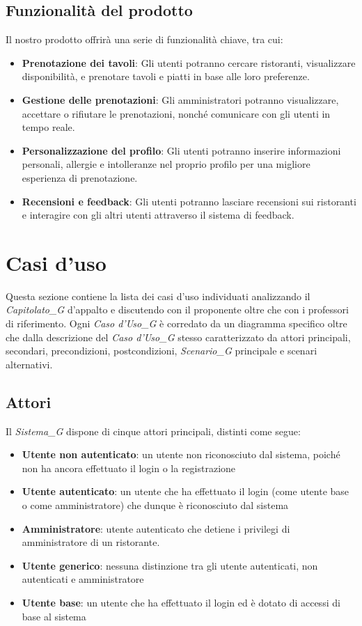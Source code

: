 \documentclass[12pt, oneside]{article}
\begin{document}
\subsection{Funzionalità del prodotto}
Il nostro prodotto offrirà una serie di funzionalità chiave, tra cui:
\begin{itemize}
\item \textbf{Prenotazione dei tavoli}: Gli utenti potranno cercare ristoranti, visualizzare disponibilità, e prenotare tavoli e piatti in base alle loro preferenze.
\item \textbf{Gestione delle prenotazioni}: Gli amministratori potranno visualizzare, accettare o rifiutare le prenotazioni, nonché comunicare con gli utenti in tempo reale.
\item \textbf{Personalizzazione del profilo}: Gli utenti potranno inserire informazioni personali, allergie e intolleranze nel proprio profilo per una migliore esperienza di prenotazione.
\item \textbf{Recensioni e feedback}: Gli utenti potranno lasciare recensioni sui ristoranti e interagire con gli altri utenti attraverso il sistema di feedback.
\end{itemize}


\newpage

\section{Casi d'uso}
Questa sezione contiene la lista dei casi d'uso individuati analizzando il \textit{Capitolato_G} d'appalto e discutendo con il proponente oltre che con i professori di riferimento. Ogni \textit{Caso d'Uso_G} è corredato da un diagramma specifico oltre che dalla descrizione del \textit{Caso d'Uso_G} stesso caratterizzato da attori principali, secondari, precondizioni, postcondizioni, \textit{Scenario_G} principale e scenari alternativi.
\subsection{Attori}
Il \textit{Sistema_G} dispone di cinque attori principali, distinti come segue:
\begin{itemize}
    \item \textbf{Utente non autenticato}: un utente non riconosciuto dal sistema, poiché non ha ancora  effettuato il login o la registrazione
    \item \textbf{Utente autenticato}: un utente che ha effettuato il login (come utente base o come amministratore) che dunque è riconosciuto dal sistema
    \item \textbf{Amministratore}: utente autenticato che detiene i privilegi di amministratore di un ristorante.
    \item \textbf{Utente generico}: nessuna distinzione tra gli utente autenticati, non autenticati e amministratore
    \item \textbf{Utente base}: un utente che ha effettuato il login ed è dotato di accessi di base al sistema
\end{itemize}
\end{document}
